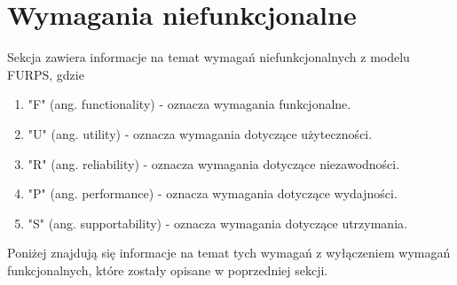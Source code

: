 \section{Wymagania niefunkcjonalne}
Sekcja zawiera informacje na temat wymagań niefunkcjonalnych z modelu FURPS, gdzie 
\begin{enumerate}
    \item "F" (ang. functionality) - oznacza wymagania funkcjonalne.
    \item "U" (ang. utility) - oznacza wymagania dotyczące użyteczności.
    \item "R" (ang. reliability) - oznacza wymagania dotyczące niezawodności.
    \item "P" (ang. performance) - oznacza wymagania dotyczące wydajności.
    \item "S" (ang. supportability) - oznacza wymagania dotyczące utrzymania.
\end{enumerate} 
Poniżej znajdują się informacje na temat tych wymagań z wyłączeniem wymagań funkcjonalnych, które zostały opisane w poprzedniej sekcji.

